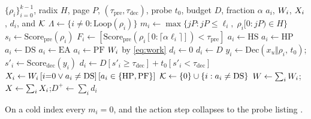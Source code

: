 \begin{algorithm}[t]
\caption{\sys admission.
$H$ stores full pages only.
$\Lambda$ is the repeated-loop set.
$0\in\Keep$ always.
\eqref{eq:dec} sets $d_i$; \eqref{eq:drej} would have set $d_i{=}0$ for every $s_i{<}\tau_{\mathrm{dec}}$.}
\label{alg:app}
\small
\begin{algorithmic}[1]
\REQUIRE $\{\rho_i\}_{i=0}^{k-1}$, radix $H$, page $P$, $(\tau_{\mathrm{pre}},\tau_{\mathrm{dec}})$, probe $t_0$, budget $D$, fraction $\alpha$
\ENSURE $a_i$, $W_i$, $X_i$, $d_i$, and $\mathcal{K}$
\STATE $\Lambda\leftarrow\{i\neq 0:\mathrm{Loop}(\rho_i)\}$
  \STATE $m_i\leftarrow\max\{jP:jP\le\ell_i,\;\rho_i[0{:}jP)\in H\}$ \COMMENT{\eqref{eq:mi}}
  \STATE $s_i\leftarrow\mathrm{Score}_{\mathrm{pre}}(\rho_i)$
  \STATE $F_i\leftarrow[\mathrm{Score}_{\mathrm{pre}}(\rho_i[0{:}\lceil\alpha\ell_i\rceil])<\tau_{\mathrm{pre}}]$
    \STATE $a_i\leftarrow\mathrm{HS}$
    \STATE $a_i\leftarrow\mathrm{HP}$
    \STATE $a_i\leftarrow\mathrm{DS}$
    \STATE $a_i\leftarrow\mathrm{EA}$
  \ELSE
    \STATE $a_i\leftarrow\mathrm{PF}$
  \ENDIF
  \STATE $W_i$ by \eqref{eq:work}
    \STATE $d_i\leftarrow 0$
    \STATE $d_i\leftarrow D$
  \ELSE
    \STATE $y_i\leftarrow\mathrm{Dec}(x_u\Vert\rho_i,\,t_0)$; \quad $s'_i\leftarrow\mathrm{Score}_{\mathrm{dec}}(y_i)$
    \STATE $d_i\leftarrow D[s'_i\ge\tau_{\mathrm{dec}}]+t_0[s'_i<\tau_{\mathrm{dec}}]$
  \ENDIF
  \STATE $X_i\leftarrow W_i\,[i{=}0\lor a_i\neq\mathrm{DS}]\,[a_i\in\{\mathrm{HP},\mathrm{PF}\}]$
\ENDFOR
\STATE $\mathcal{K}\leftarrow\{0\}\cup\{i:a_i\neq\mathrm{DS}\}$
\STATE $W\leftarrow\sum_iW_i$;\quad $X\leftarrow\sum_iX_i$;\quad $D^{+}\leftarrow\sum_i d_i$
\end{algorithmic}
\end{algorithm}

On a cold index every $m_i{=}0$, and the action step collapses to the probe listing .

